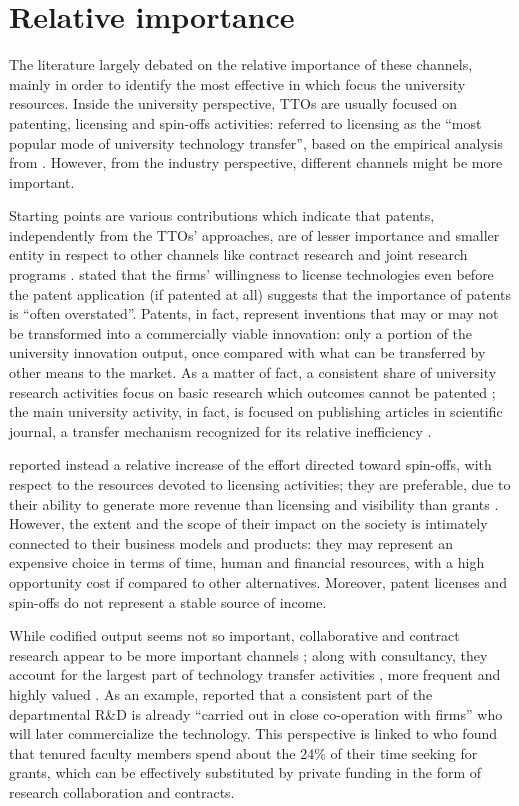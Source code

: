 \section{Relative importance}

The literature largely debated on the relative importance of these channels, mainly in order to identify the most effective in which focus the university resources. Inside the university perspective, TTOs are usually focused on patenting, licensing and spin-offs activities: \citet{Chapple2005} referred to licensing as the \enquote{most popular mode of university technology transfer}, based on the empirical analysis from \citet{Siegel2003}. However, from the industry perspective, different channels might be more important.

Starting points are various contributions which indicate that patents, independently from the TTOs' approaches, are of lesser importance and smaller entity in respect to other channels like contract research and joint research programs \citep{DEste2007}. \citet{Link2005} stated that the firms' willingness to license technologies even before the patent application (if patented at all) suggests that the importance of patents is \enquote{often overstated}. Patents, in fact, represent inventions that may or may not be transformed into a commercially viable innovation: only a portion of the university innovation output, once compared with what can be transferred by other means to the market. As a matter of fact, a consistent share of university research activities focus on basic research which outcomes cannot be patented \citep{Fritsch2007}; the main university activity, in fact, is focused on publishing articles in scientific journal, a transfer mechanism recognized for its relative inefficiency \citet{Rogers2001}. 

\citet{Balderi2007} reported instead a relative increase of the effort directed toward spin-offs, with respect to the resources devoted to licensing activities; they are preferable, due to their ability to generate more revenue than licensing and visibility than grants \citep{Rasmussen2006}. However, the extent and the scope of their impact on the society is intimately connected to their business models and products: they may represent an expensive choice in terms of time, human and financial resources, with a high opportunity cost if compared to other alternatives. Moreover, patent licenses and spin-offs do not represent a stable source of income. 

While codified output seems not so important, collaborative and contract research appear to be more important channels \citep{Bekkers2008}; along with consultancy, they account for the largest part of technology transfer activities \citep{Muscio2010}, more frequent and highly valued \citep{DEste2011}. As an example, \citet{Rasmussen2006} reported that a consistent part of the departmental R\&D is already \enquote{carried out in close co-operation with firms} who will later commercialize the technology. This perspective is linked to \citet{Link2007} who found that tenured faculty members spend about the 24\% of their time seeking for grants, which can be effectively substituted by private funding in the form of research collaboration and contracts. 

